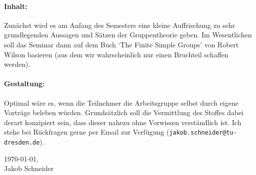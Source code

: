 \documentclass[14pt]{memoir}
\begin{document}
\paragraph{\color{darkblue}\Large Inhalt:}

Zunächst wird es am Anfang des Semesters eine kleine Auffrischung zu sehr grundlegenden Aussagen und Sätzen der Gruppentheorie geben.
Im Wesentlichen soll das Seminar dann auf dem Buch `The Finite Simple Groups' von Robert Wilson
basieren (aus dem wir wahrscheinlich nur einen Bruchteil schaffen werden).

\paragraph{\color{darkblue}\Large Gestaltung:} Optimal wäre es, wenn die Teilnehmer die Arbeitsgruppe selbst
durch eigene Vorträge beleben würden. Grundsätzlich soll die Vermittlung des Stoffes dabei derart konzipiert sein, dass dieser nahezu ohne Vorwissen verständlich ist. Ich stehe bei Rückfragen gerne per Email zur Verfügung (\texttt{jakob.schneider@tu-dresden.de}).%

\begin{flushright}
    \today,\\
    Jakob Schneider  
\end{flushright}
\end{document}
